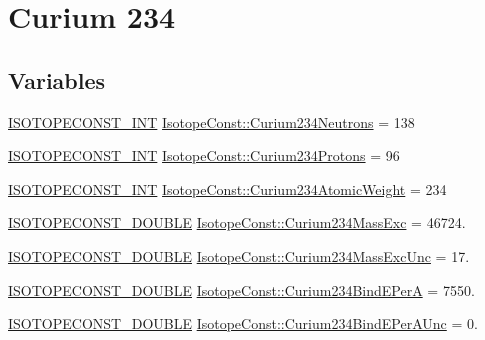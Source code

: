 \hypertarget{group___isotope_const-_curium-_cm234}{}\section{Curium 234}
\label{group___isotope_const-_curium-_cm234}
\subsection*{Variables}
\begin{DoxyCompactItemize}
\item 
\mbox{\hyperlink{group___isotope_const-_macros_ga5f18360b3e99483a35c32d789e62621c}{I\+S\+O\+T\+O\+P\+E\+C\+O\+N\+S\+T\+\_\+\+I\+NT}} \mbox{\hyperlink{group___isotope_const-_curium-_cm234_ga4450b6d72fd5802ac434aba960c2904e}{Isotope\+Const\+::\+Curium234\+Neutrons}} = 138
\item 
\mbox{\hyperlink{group___isotope_const-_macros_ga5f18360b3e99483a35c32d789e62621c}{I\+S\+O\+T\+O\+P\+E\+C\+O\+N\+S\+T\+\_\+\+I\+NT}} \mbox{\hyperlink{group___isotope_const-_curium-_cm234_ga0f4e0783ac84c9803476a5ef3c00f200}{Isotope\+Const\+::\+Curium234\+Protons}} = 96
\item 
\mbox{\hyperlink{group___isotope_const-_macros_ga5f18360b3e99483a35c32d789e62621c}{I\+S\+O\+T\+O\+P\+E\+C\+O\+N\+S\+T\+\_\+\+I\+NT}} \mbox{\hyperlink{group___isotope_const-_curium-_cm234_ga376c345710eea63df224b5b62e7133e8}{Isotope\+Const\+::\+Curium234\+Atomic\+Weight}} = 234
\item 
\mbox{\hyperlink{group___isotope_const-_macros_ga8f45a7272ce02c0b4c65c44636ed719a}{I\+S\+O\+T\+O\+P\+E\+C\+O\+N\+S\+T\+\_\+\+D\+O\+U\+B\+LE}} \mbox{\hyperlink{group___isotope_const-_curium-_cm234_ga22d682a148047ad8336f2f8e3b53247b}{Isotope\+Const\+::\+Curium234\+Mass\+Exc}} = 46724.
\item 
\mbox{\hyperlink{group___isotope_const-_macros_ga8f45a7272ce02c0b4c65c44636ed719a}{I\+S\+O\+T\+O\+P\+E\+C\+O\+N\+S\+T\+\_\+\+D\+O\+U\+B\+LE}} \mbox{\hyperlink{group___isotope_const-_curium-_cm234_gac5a4d559b6b90afdfc7e659d058b9d40}{Isotope\+Const\+::\+Curium234\+Mass\+Exc\+Unc}} = 17.
\item 
\mbox{\hyperlink{group___isotope_const-_macros_ga8f45a7272ce02c0b4c65c44636ed719a}{I\+S\+O\+T\+O\+P\+E\+C\+O\+N\+S\+T\+\_\+\+D\+O\+U\+B\+LE}} \mbox{\hyperlink{group___isotope_const-_curium-_cm234_gab0e4e6f4299f6dc5b3428e585b718517}{Isotope\+Const\+::\+Curium234\+Bind\+E\+PerA}} = 7550.
\item 
\mbox{\hyperlink{group___isotope_const-_macros_ga8f45a7272ce02c0b4c65c44636ed719a}{I\+S\+O\+T\+O\+P\+E\+C\+O\+N\+S\+T\+\_\+\+D\+O\+U\+B\+LE}} \mbox{\hyperlink{group___isotope_const-_curium-_cm234_ga3890dbc72e5abf6a3fa92c573a0c6b29}{Isotope\+Const\+::\+Curium234\+Bind\+E\+Per\+A\+Unc}} = 0.

\end{DoxyCompactItemize}
